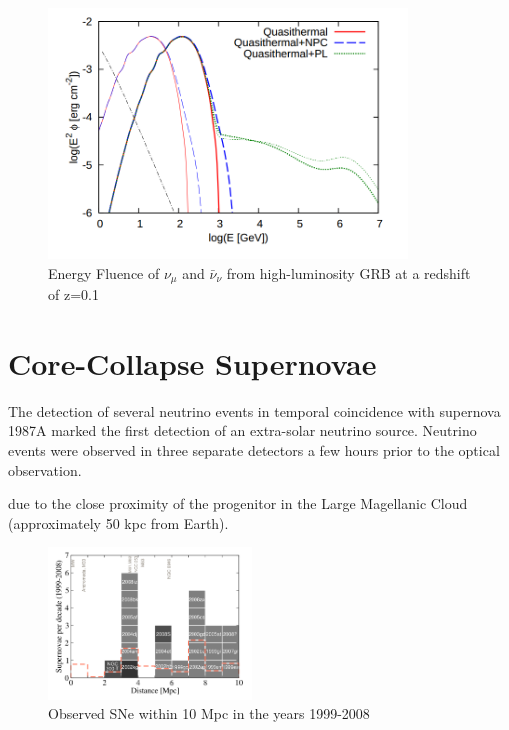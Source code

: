 \documentclass{gatech-thesis}
\begin{document}
\begin{figure}[ht]
  \begin{center}
    \includegraphics[width=0.85\textwidth,keepaspectratio]{SubPhotoFluence.png}
  \end{center}
  \caption{Energy Fluence of $\nu_{\mu}$ and $\bar{\nu}_{\nu}$ from high-luminosity GRB at a redshift of z=0.1 \cite{2013PhRvL.111m1102M}}
  \label{fig:subphotospheric_nus}
\end{figure}

\section{Core-Collapse Supernovae}
The detection of several neutrino events in temporal coincidence with supernova 1987A marked the first detection of an extra-solar neutrino source. Neutrino events were observed in three separate detectors a few hours prior to the optical observation. 

due to the close proximity of the progenitor in the Large Magellanic Cloud (approximately 50 kpc  from Earth).


\begin{figure}
  \begin{center}
    \includegraphics[width=0.48\textwidth,keepaspectratio]{NearbySNCatalogue.png}
  \end{center}
  \caption{Observed SNe within 10 Mpc in the years 1999-2008 \cite{2011PhRvD..83l3008K}}
  \label{fig:local_ccsne}
\end{figure}
\end{document}
